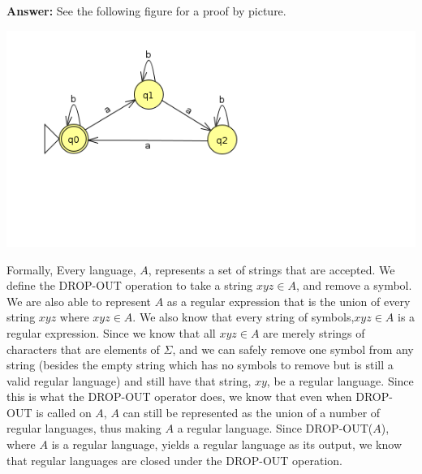\documentclass{article}
\begin{document}
{\bf Answer: } See the following figure for a proof by picture.

\begin{center}
\includegraphics[width=.5\textwidth]{1_43.png}
\end{center}


Formally, Every language, $A$, represents a set of strings that are accepted. We define the DROP-OUT operation to take a string  $xyz \in A$, and remove a symbol. We are also able to represent $A$ as a regular expression that is the union of every string $xyz$ where $xyz \in A$. We also know that every string of symbols,$xyz \in A$ is a regular expression. Since we know that all $xyz \in A$ are merely strings of characters that are elements of $\Sigma$, and we can safely remove one symbol from any string (besides the empty string which has no symbols to remove but is still a valid regular language) and still have that string, $xy$, be a regular language. Since this is what the DROP-OUT operator does, we know that even when DROP-OUT is called on $A$, $A$ can still be represented as the union of a number of regular languages, thus making $A$ a regular language. Since DROP-OUT($A$), where $A$ is a regular language, yields a regular language as its output, we know that regular languages are closed under the DROP-OUT operation.
\end{document}
